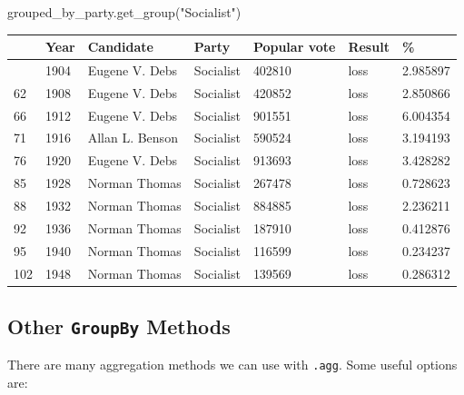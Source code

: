 \documentclass[
  letterpaper,
  DIV=11,
  numbers=noendperiod]{scrreprt}
\newenvironment{Shaded}{\begin{snugshade}}{\end{snugshade}}
\newcommand{\NormalTok}[1]{\textcolor[rgb]{0.00,0.23,0.31}{#1}}
\newcommand{\StringTok}[1]{\textcolor[rgb]{0.13,0.47,0.30}{#1}}
\begin{document}
\begin{Shaded}
\begin{Highlighting}[]
\NormalTok{grouped\_by\_party.get\_group(}\StringTok{"Socialist"}\NormalTok{)}
\end{Highlighting}
\end{Shaded}

\begin{longtable}[]{@{}lllllll@{}}
\toprule\noalign{}
& Year & Candidate & Party & Popular vote & Result & \% \\
\midrule\noalign{}
\endhead
\bottomrule\noalign{}
\endlastfoot
58 & 1904 & Eugene V. Debs & Socialist & 402810 & loss & 2.985897 \\
62 & 1908 & Eugene V. Debs & Socialist & 420852 & loss & 2.850866 \\
66 & 1912 & Eugene V. Debs & Socialist & 901551 & loss & 6.004354 \\
71 & 1916 & Allan L. Benson & Socialist & 590524 & loss & 3.194193 \\
76 & 1920 & Eugene V. Debs & Socialist & 913693 & loss & 3.428282 \\
85 & 1928 & Norman Thomas & Socialist & 267478 & loss & 0.728623 \\
88 & 1932 & Norman Thomas & Socialist & 884885 & loss & 2.236211 \\
92 & 1936 & Norman Thomas & Socialist & 187910 & loss & 0.412876 \\
95 & 1940 & Norman Thomas & Socialist & 116599 & loss & 0.234237 \\
102 & 1948 & Norman Thomas & Socialist & 139569 & loss & 0.286312 \\
\end{longtable}

\subsection{\texorpdfstring{Other \texttt{GroupBy}
Methods}{Other GroupBy Methods}}\label{other-groupby-methods}

There are many aggregation methods we can use with \texttt{.agg}. Some
useful options are:
\end{document}
